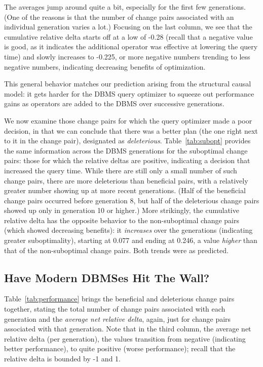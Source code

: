 \documentclass[prodmode,acmtods]{acmsmall}
\begin{document}
The averages jump around quite a bit, especially for the first few
generations. (One of the reasons is that the number of change pairs
associated with an individual generation varies a
lot.) \hbox{Focusing} on the last column, we see that the cumulative
relative delta starts off at a low of
-0.28 (recall that a negative value is good, as it indicates the
additional operator was effective at lowering the query time) and slowly
increases to -0.225, or more negative numbers trending to less negative
numbers, indicating decreasing benefits of optimization.

This general behavior matches our prediction arising from the structural
causal model: it gets harder for the DBMS query optimizer to squeeze out
performance gains as operators are added to the \hbox{DBMS} over successive
generations.

We now examine those change pairs for which the query optimizer made a poor
decision, in that we can conclude that there was a better plan (the one
right next to it in the change pair), designated as {\em deleterious}. Table~\ref{tab:subopt} provides the
same information across the \hbox{DBMS} generations for the suboptimal
change pairs: those for which the relative deltas are positive, indicating a
decision that increased the query time. While there are still only a small
number of such change pairs, there are more deleterious than beneficial
pairs, with a relatively greater number showing up at more recent
generations. (Half of the beneficial change pairs occurred before generation
8, but half of the deleterious change pairs showed up only in generation 10
or higher.) More strikingly, the cumulative relative delta has the opposite
behavior to the \hbox{non-suboptimal} change pairs (which showed decreasing
benefits): it {\em increases} over the generations (indicating greater
suboptimality), starting at 0.077 and ending at 0.246, a value {\em higher}
than that of the non-suboptimal change pairs. Both trends were as predicted.

\subsection{Have Modern DBMSes Hit The Wall?}\label{sec:hitthewall}
Table~\ref{tab:performance} brings the beneficial and deleterious change
pairs together, stating the total number of change pairs associated with
each generation and the {\em average net relative delta}, again, just for
change pairs associated with that generation. Note that in the third column,
the average net relative delta (per generation), the values transition from
negative (indicating better performance), to quite positive (worse
performance); recall that the relative delta is bounded by -1 and 1.
\end{document}
